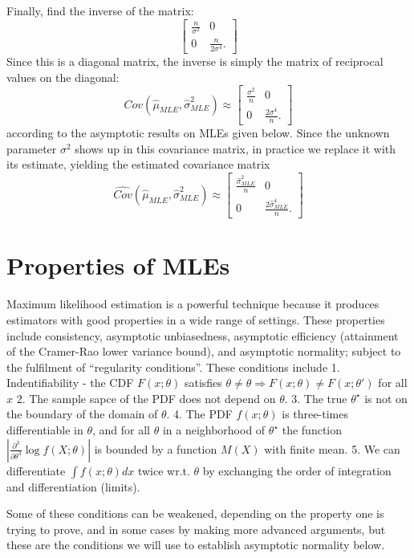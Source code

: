 \documentclass[
]{book}
\begin{document}
Finally, find the inverse of the matrix:
\[\begin{bmatrix}
\frac{n}{\sigma^2} &0 \\
0 &\frac{n}{2\sigma^4}.
\end{bmatrix}\]
Since this is a diagonal matrix, the inverse is simply the matrix of reciprocal values on the diagonal:
\[Cov(\hat\mu_{MLE}, \hat\sigma^2_{MLE}) \approx \begin{bmatrix}
\frac{\sigma^2}{n} &0 \\
0 &\frac{2\sigma^4}{n}.
\end{bmatrix}\]
according to the asymptotic results on MLEs given below. Since the unknown parameter \(\sigma^2\) shows up in this covariance matrix, in practice we replace it with its estimate, yielding the estimated covariance matrix
\[\widehat {Cov}(\hat\mu_{MLE}, \hat\sigma^2_{MLE}) \approx \begin{bmatrix}
\frac{\hat\sigma_{MLE}^2}{n} &0 \\
0 &\frac{2\hat\sigma_{MLE}^4}{n}.
\end{bmatrix}\]

\hypertarget{properties-of-mles}{%
\section{Properties of MLEs}\label{properties-of-mles}}

Maximum likelihood estimation is a powerful technique because it produces estimators with good properties in a wide range of settings. These properties include consistency, asymptotic unbiasedness, asymptotic efficiency (attainment of the Cramer-Rao lower variance bound), and asymptotic normality; subject to the fulfilment of ``regularity conditions''. These conditions include
1. Indentifiability - the CDF \(F(x; \theta)\) satisfies \(\theta\ne\theta\Rightarrow F(x;\theta)\ne F(x;\theta')\) for all \(x\)
2. The sample sapce of the PDF does not depend on \(\theta\).
3. The true \(\theta^\star\) is not on the boundary of the domain of \(\theta\).
4. The PDF \(f(x;\theta)\) is three-times differentiable in \(\theta\), and for all \(\theta\) in a neighborhood of \(\theta^\star\) the function \(|\frac{\partial^3}{\partial\theta^3}\log f(X;\theta)|\) is bounded by a function \(M(X)\) with finite mean.
5. We can differentiate \(\int f(x;\theta)dx\) twice wr.t. \(\theta\) by exchanging the order of integration and differentiation (limits).

Some of these conditions can be weakened, depending on the property one is trying to prove, and in some cases by making more advanced arguments, but these are the conditions we will use to establish asymptotic normality below.
\end{document}
